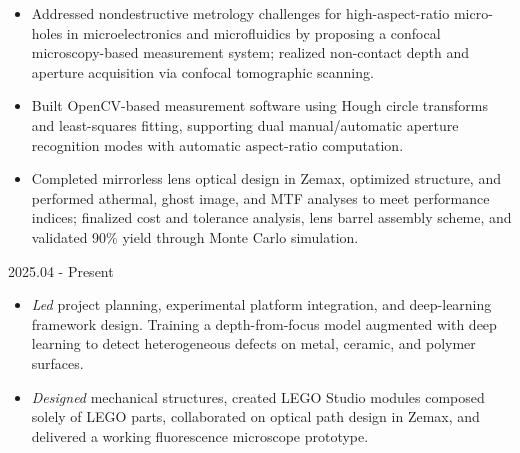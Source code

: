 \documentclass{resume}
\begin{document}
\begin{itemize}[parsep=0.5ex]
\item Addressed nondestructive metrology challenges for high-aspect-ratio micro-holes in microelectronics and microfluidics by proposing a confocal microscopy-based measurement system; realized non-contact depth and aperture acquisition via confocal tomographic scanning.
\item Built OpenCV-based measurement software using Hough circle transforms and least-squares fitting, supporting dual manual/automatic aperture recognition modes with automatic aspect-ratio computation.
\end{itemize}

\begin{itemize}[parsep=0.5ex]
\item Completed mirrorless lens optical design in Zemax, optimized structure, and performed athermal, ghost image, and MTF analyses to meet performance indices; finalized cost and tolerance analysis, lens barrel assembly scheme, and validated 90\% yield through Monte Carlo simulation.
\end{itemize}

 {2025.04 - Present}
\begin{itemize}[parsep=0.5ex]
  \item \textit{Led} project planning, experimental platform integration, and deep-learning framework design. Training a depth-from-focus model augmented with deep learning to detect heterogeneous defects on metal, ceramic, and polymer surfaces.
\end{itemize}

\begin{itemize}[parsep=0.5ex]
  \item \textit{Designed} mechanical structures, created LEGO Studio modules composed solely of LEGO parts, collaborated on optical path design in Zemax, and delivered a working fluorescence microscope prototype.
\end{itemize}
\end{document}
